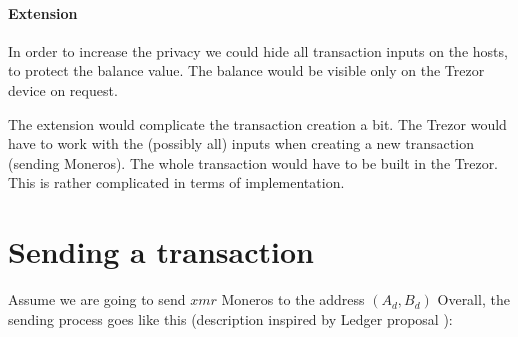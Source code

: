 \documentclass[]{article}
\begin{document}
\paragraph{Extension} In order to increase the privacy we could hide all transaction inputs on the hosts, to protect the balance value. The balance would be visible only on the Trezor device on request.

The extension would complicate the transaction creation a bit. The Trezor would have to work with the (possibly all) inputs when creating a new transaction (sending Moneros). The whole transaction would have to be built in the Trezor. This is rather complicated in terms of implementation. 


\section{Sending a transaction}
Assume we are going to send $xmr$ Moneros to the address $(A_d, B_d)$
Overall, the sending process goes like this (description inspired by Ledger proposal \cite{ledger_doc}):
\end{document}

